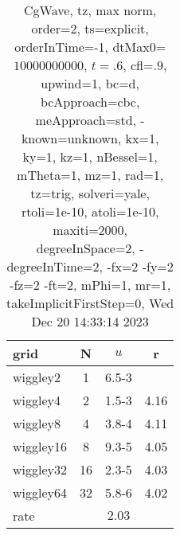 \begin{table}[H]\tableFont %
\begin{center}
\begin{tabular}{|l|c|c|c|} \hline 
grid  & N &  $ u $ & r \\ \hline 
  wiggley2 &     1 & \num{6.5}{-3} &        \\ \hline
  wiggley4 &     2 & \num{1.5}{-3} &  4.16  \\ \hline
  wiggley8 &     4 & \num{3.8}{-4} &  4.11  \\ \hline
 wiggley16 &     8 & \num{9.3}{-5} &  4.05  \\ \hline
 wiggley32 &    16 & \num{2.3}{-5} &  4.03  \\ \hline
 wiggley64 &    32 & \num{5.8}{-6} &  4.02  \\ \hline
    rate             &       &  $2.03$       &       \\ \hline
\end{tabular}
\caption{CgWave, tz, max norm, order=$2$, ts=explicit, orderInTime=-1, dtMax0=$10000000000$, $t=.6$, cfl=$.9$, upwind=1, bc=d, bcApproach=cbc, meApproach=std, -known=unknown, kx=1, ky=1, kz=1, nBessel=1, mTheta=1, mz=1, rad=1, tz=trig, solveri=yale, rtoli=1e-10, atoli=1e-10, maxiti=2000, degreeInSpace=2, -degreeInTime=2, -fx=2 -fy=2 -fz=2 -ft=2, mPhi=1, mr=1, takeImplicitFirstStep=0, Wed Dec 20 14:33:14 2023}\label{table:tzOrder2max}
\end{center}
\end{table}
